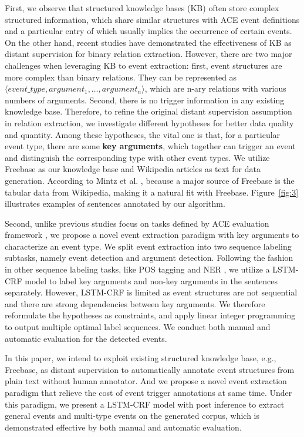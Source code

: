 First, we observe that structured knowledge bases (KB) often store
complex structured information, which share similar structures with ACE event definitions and a particular entry of which usually implies the occurrence of certain events.
On the other hand, recent studies \cite{mintz2009distant,zeng2015distant} have demonstrated the effectiveness of KB as distant supervision for binary relation extraction.
However, there are two major challenges when leveraging KB to event extraction: first, event structures are more complex than binary relations. They can be represented as $\langle event\_type, argument_1, \ldots, argument_n\rangle$, which are n-ary relations with various numbers of arguments. Second, there is no trigger information in any existing knowledge base. Therefore, to refine the original distant supervision assumption in relation extraction, we investigate different hypotheses for better data quality and quantity. Among these hypotheses, the vital one is that, for a particular event type, there are some \textbf{key arguments}, which together can trigger an event and distinguish the corresponding type with other event types. We utilize Freebase as our knowledge base and Wikipedia articles as text for data generation. According to Mintz et al. , because a major source of Freebase is the tabular data from Wikipedia, making it a natural fit with Freebase. Figure~\ref{fig:3} illustrates examples of sentences annotated by our algorithm.

Second, unlike previous studies focus on tasks defined by ACE evaluation framework \cite{ahn2006stages,li2013joint,chen2015event,nguyen2016joint}, we propose a novel event extraction paradigm with key arguments to characterize an event type. We split event extraction into two sequence labeling subtasks, namely event detection and argument detection. Following the fashion in other sequence labeling tasks, like POS tagging and NER \cite{huang2015bidirectional,lample2016neural}, we utilize a LSTM-CRF model to label key arguments and non-key arguments in the sentences separately. However, LSTM-CRF is limited as event structures are not sequential and there are strong dependencies between key arguments. We therefore reformulate the hypotheses as constraints, and apply linear integer programming to output multiple optimal label sequences. We conduct both manual and automatic evaluation for the detected events. 

In this paper, we intend to exploit existing structured knowledge base, e.g., Freebase, as distant supervision to automatically annotate event structures from plain text without human annotator. And we propose a novel event extraction paradigm that relieve the cost of event trigger annotations at same time. Under this paradigm, we present a LSTM-CRF model with post inference to extract general events and multi-type events on the generated corpus, which is demonstrated effective by both manual and automatic evaluation.
